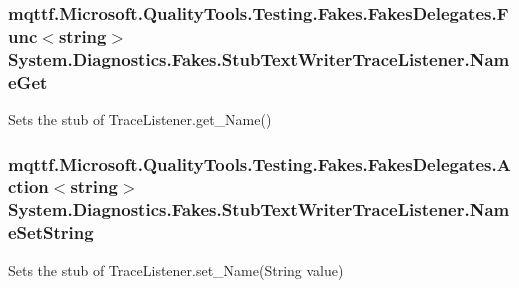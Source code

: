 \hypertarget{class_system_1_1_diagnostics_1_1_fakes_1_1_stub_text_writer_trace_listener_a7f3406cd363d8081f8368ea74a93fd87}{
\subsubsection[{Name\-Get}]{\setlength{\rightskip}{0pt plus 5cm}mqttf.\-Microsoft.\-Quality\-Tools.\-Testing.\-Fakes.\-Fakes\-Delegates.\-Func$<$string$>$ System.\-Diagnostics.\-Fakes.\-Stub\-Text\-Writer\-Trace\-Listener.\-Name\-Get}}\label{class_system_1_1_diagnostics_1_1_fakes_1_1_stub_text_writer_trace_listener_a7f3406cd363d8081f8368ea74a93fd87}


Sets the stub of Trace\-Listener.\-get\-\_\-\-Name()

\hypertarget{class_system_1_1_diagnostics_1_1_fakes_1_1_stub_text_writer_trace_listener_a1c79f9d2181e42c36b756a017c86f941}{
\subsubsection[{Name\-Set\-String}]{\setlength{\rightskip}{0pt plus 5cm}mqttf.\-Microsoft.\-Quality\-Tools.\-Testing.\-Fakes.\-Fakes\-Delegates.\-Action$<$string$>$ System.\-Diagnostics.\-Fakes.\-Stub\-Text\-Writer\-Trace\-Listener.\-Name\-Set\-String}}\label{class_system_1_1_diagnostics_1_1_fakes_1_1_stub_text_writer_trace_listener_a1c79f9d2181e42c36b756a017c86f941}


Sets the stub of Trace\-Listener.\-set\-\_\-\-Name(\-String value)

